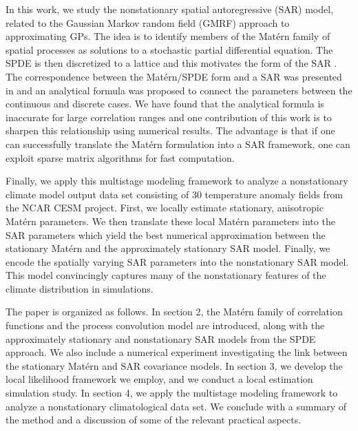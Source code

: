 \documentclass[review]{elsarticle}
\begin{document}
In this work, we study the nonstationary spatial autoregressive (SAR) model, related to the Gaussian Markov random field (GMRF) approach to approximating GPs. The idea is to identify members of the Mat\'ern family of spatial processes as solutions to a stochastic partial differential equation. The SPDE is then discretized to a lattice and this motivates the form of the SAR \cite{lindgren2011explicit}. The correspondence between the Mat\'ern/SPDE form and a SAR was presented in \cite{lindgren2011explicit} and an analytical formula was proposed to connect the parameters between the continuous and discrete cases. We have found that the analytical formula is inaccurate for large correlation ranges and one contribution of this work is to sharpen this relationship using numerical results. The advantage is that if one can successfully translate the Mat\'ern formulation into a SAR framework, one can exploit sparse matrix algorithms for fast computation.


Finally, we apply this multistage modeling framework to analyze a nonstationary climate model output data set consisting of 30 temperature anomaly fields from the NCAR CESM project. First, we locally estimate stationary, anisotropic Mat\'ern parameters. We then translate these local Mat\'ern parameters into the SAR parameters which yield the best numerical approximation between the stationary Mat\'ern and the approximately stationary SAR model. Finally, we encode the spatially varying SAR parameters into the nonstationary SAR model. This model convincingly captures many of the nonstationary features of the climate distribution in simulations. 


The paper is organized as follows. In section 2, the Mat\'ern family of correlation functions and the process convolution model are introduced, along with the approximately stationary and nonstationary SAR models from the SPDE approach. We also include a numerical experiment investigating the link between the stationary Mat\'ern and SAR covariance models. In section 3, we develop the local likelihood framework we employ, and we conduct a local estimation simulation study.  In section 4, we apply the multistage modeling framework to analyze a nonstationary climatological data set. We conclude with a summary of the method and a discussion of some of the relevant practical aspects.
\end{document}
